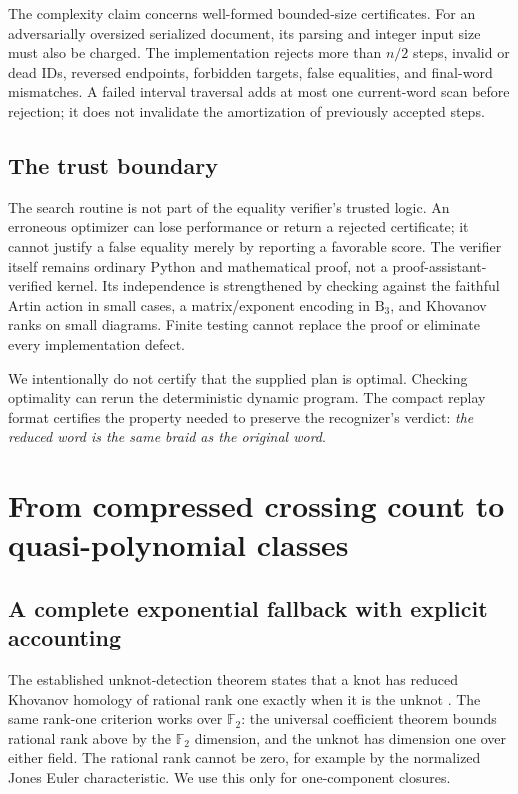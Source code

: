 \documentclass[11pt]{article}
\theoremstyle{definition}
\theoremstyle{remark}
\newcommand{\B}{\mathrm B}
\newcommand{\F}{\mathbb F}
\begin{document}
The complexity claim concerns well-formed bounded-size certificates. For an
adversarially oversized serialized document, its parsing and integer input
size must also be charged. The implementation rejects more than $n/2$ steps,
invalid or dead IDs, reversed endpoints, forbidden targets, false equalities,
and final-word mismatches. A failed interval traversal adds at most one
current-word scan before rejection; it does not invalidate the amortization
of previously accepted steps.

\subsection{The trust boundary}
The search routine is not part of the equality verifier's trusted logic.
An erroneous optimizer can lose performance or return a rejected certificate;
it cannot justify a false equality merely by reporting a favorable score.
The verifier itself remains ordinary Python and mathematical proof, not a
proof-assistant-verified kernel. Its independence is strengthened by checking
against the faithful Artin action in small cases, a matrix/exponent encoding
in $\B_3$, and Khovanov ranks on small diagrams. Finite testing cannot replace
the proof or eliminate every implementation defect.

We intentionally do not certify that the supplied plan is optimal. Checking
optimality can rerun the deterministic dynamic program. The compact replay
format certifies the property needed to preserve the recognizer's verdict:
\emph{the reduced word is the same braid as the original word}.

\section{From compressed crossing count to quasi-polynomial classes}
\subsection{A complete exponential fallback with explicit accounting}
The established unknot-detection theorem states that a knot has reduced
Khovanov homology of rational rank one exactly when it is the unknot
\cite{kronheimer-mrowka}. The same rank-one criterion works over $\F_2$:
the universal coefficient theorem bounds rational rank above by the
$\F_2$ dimension, and the unknot has dimension one over either field.
The rational rank cannot be zero, for example by the normalized Jones Euler
characteristic. We use this only for one-component closures.
\end{document}
